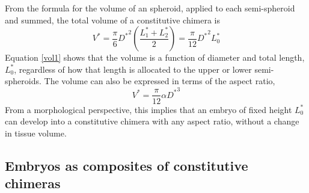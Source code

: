 \documentclass[10pt,a4paper]{article}
\begin{document}
From the formula for the volume of an spheroid, applied to each semi-spheroid and summed, the total volume of a constitutive chimera is
\begin{equation}\label{vol1}
	V^* = \frac{\pi}{6} {D^*}^2 \left(\frac{L_1^*+L_2^*}{2}\right) = \frac{\pi}{12} {D^*}^2 L_0^*
\end{equation} 
Equation \ref{vol1} shows that the volume is a function of diameter and total length, $L_0^*$, regardless of how that length is allocated to the upper or lower semi-spheroids.
The volume can also be expressed in terms of the aspect ratio,
\begin{equation}\label{vol2}
	V^* = \frac{\pi}{12} \alpha {D^*}^3
\end{equation} 
From a morphological perspective, this implies that an embryo of fixed height $L_0^*$ can develop into a constitutive chimera with any aspect ratio, without a change in tissue volume. 

\subsection{Embryos as composites of constitutive chimeras}
\end{document}
